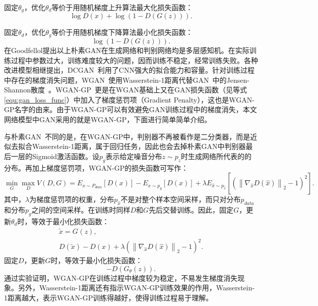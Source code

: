 \noindent 固定$\theta_{g}$，优化$\theta_{d}$等价于用随机梯度上升算法最大化损失函数：
\begin{equation*}
\log D\left(x\right)+\log \left(1-D\left(G\left(z\right)\right)\right).
\end{equation*}

\noindent 固定$\theta_{d}$，优化$\theta_{g}$等价于用随机梯度下降算法最小化损失函数：
\begin{equation*}
\log \left(1-D\left(G\left(z\right)\right)\right).
\end{equation*}
\noindent 在Goodfellol提出以上朴素GAN在生成网络和判别网络均是多层感知机。在实际训练过程中参数过大，训练难度较大的问题，因而训练不稳定，经常训练失败。各种改进模型相继提出，DCGAN~\cite{radford2015unsupervised}利用了CNN强大的拟合能力和容量。针对训练过程中存在的梯度消失问题，WGAN~\cite{gulrajani2017improved}使用Wasserstein-1距离代替GAN~\cite{goodfellow2014generative}中的Jensen-Shannon散度~\cite{arjovsky2017towards}。WGAN-GP~\cite{gulrajani2017improved}更是在WGAN基础上又在GAN损失函数（见等式\ref{equ:gan_loss_func}）中加入了梯度惩罚项（Gradient Penalty），这也是WGAN-GP名字的由来。由于WGAN-GP可以有效避免GAN训练过程中的梯度消失，本文网络模型中GAN采用的就是WGAN-GP，下面进行简单简单介绍。

与朴素GAN~\cite{goodfellow2014generative}不同的是，在WGAN-GP中，判别器不再被看作是二分类器，而是近似去拟合Wasserstein-1距离，属于回归任务，因此也会去掉朴素GAN中判别器最后一层的Sigmoid激活函数。设$p_g$表示给定噪音分布$z\sim p_z$时生成网络所代表的的分布。再加上梯度惩罚项，WGAN-GP的损失函数可写作：
\begin{equation}\label{wgan_gp_loss_func}
\min _{G} \max _{D} V(D, G)=E_{x \sim P_{d a t a}}[D(x)]-E_{x \sim p_{g}}[D(x)]+\lambda E_{\hat{x} \sim p_{\hat{x}}}\left[\left(\left\|\nabla_{\hat{x}} D(\hat{x})\right\|_{2}-1\right)^{2}\right].
\end{equation}
其中，$\lambda$为梯度惩罚项的权重，分布$p_{\hat{x}}$不是对整个样本空间采样，而只对分布$p_{data}$和分布$p_{g}$之间的空间采样。在训练时同样$D$和$G$先后交替训练。因此，固定$G$，更新$\theta_{d}$时，等效于最小化损失函数：
\begin{gather*}
\tilde{{x}} = G_{}({z}), \\
D(\tilde{{x}})-D({x})+\lambda\left(\left\|\nabla_{\hat{x}} D(\hat{x})\right\|_{2}-1\right)^{2}.
\end{gather*}
\noindent 固定$D$，更新$G$时，等效于最小化损失函数：
\begin{equation*}
-D\left(G_{\theta}(z)\right).
\end{equation*}
通过实验证明，WGAN-GP在训练过程中梯度较为稳定，不易发生梯度消失现象。另外，Wasserstein-1距离还有指示WGAN-GP训练效果的作用，Wasserstein-1距离越大，表示WGAN-GP训练得越好，使得训练过程易于理解。
